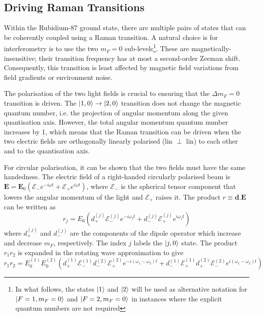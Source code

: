 \subsection{Driving Raman Transitions}\label{subsec:theory_rb87_raman}
Within the Rubidium-87 ground state, there are multiple pairs of
states that can be coherently coupled using a Raman transition.
A natural choice is for interferometry is to use the two $m_F = 0$ sub-levels\footnote{In what follows,
  the states $\ket{1}$ and $\ket{2}$ will be used as alternative
  notation for $\ket{F=1,m_F=0}$ and $\ket{F=2,m_F=0}$ in instances
  where the
explicit quantum numbers are not required}. These
are magnetically-insensitive; their transition frequency has at most a
second-order Zeeman shift. Consequently, this transition is least
affected by magnetic field variations from field gradients or
environment noise. 
\par\noindent
The polarisation of the two light fields is
crucial to ensuring that the $\Delta m_F = 0$ transition is driven.
The $\ket{1,0} \rightarrow \ket{2,0}$ transition does not change the
magnetic quantum number, i.e. the projection of angular momentum
along the given quantisation axis. However, the total angular momentum quantum number
increases by 1, which means that the Raman transition can be driven
when the two electric
fields are orthogonally linearly polarised (lin $\perp$ lin) to each
other and to the quantisation axis. \par\noindent
For circular polarisation, it can be shown that the two fields must
have the same handedness. The electric field of a right-handed
circularly polarised beam is $\textbf{E} = \textbf{E}_0\left(\mathcal{E}_- e^{-i \omega t} + \mathcal{E}_+
e^{i \omega t}\right)$, where $\mathcal{E}_-$ is the spherical tensor
component that lowers the angular momentum of the light and
$\mathcal{E}_+$ raises it. The product $r \equiv \textbf{d.E}$
can be written as
\begin{equation}
  \label{eq:dipole_expansion}
  r_j =  
E_0(d^{(j)}_+ \mathcal{E}^{(j)}_- e^{-i \omega_j t} + d^{(j)}_- \mathcal{E}^{(j)}_+ e^{i
\omega_j t})
\end{equation}
where $d^{(j)}_+$ and $d^{(j)}_-$ are the components of the dipole operator which
increase and decrease $m_F$, respectively. The index $j$ labels
the $\ket{j,0}$ state. The product $r_1 r_2$ is expanded in the
rotating wave approximation to
give
\begin{equation}
  \label{eq:dipole_exp}
  r_1 r_2= E^{(1)}_0E^{(2)}_0(d^{(1)}_+ \mathcal{E}^{(1)}_- d^{(2)}_-
  \mathcal{E}^{(2)}_+ e^{-i (\omega_1 - \omega_2)
    t} + d^{(1)}_- \mathcal{E}^{(1)}_+ d^{(2)}_+ \mathcal{E}^{(2)}_-  e^{i(
\omega_1 -\omega_2)t})
\end{equation}

